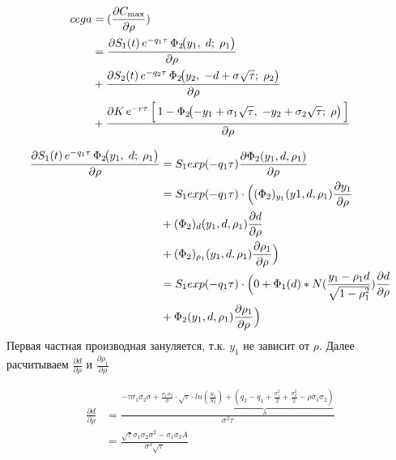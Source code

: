 \begin{equation}
\begin{aligned}
cega &= (\frac{\partial C_{\max}}{\partial \rho})  \\
     &= \frac{\partial S_1(t)\,e^{-q_1\tau}\,\Phi_2\!\bigl(y_1,\;d;\;\rho_1\bigr) }{\partial \rho} \\
     &+ \frac{\partial S_2(t)\,e^{-q_2\tau}\,\Phi_2\!\bigl(y_2,\;-d + \sigma \sqrt{\tau};\;\rho_2\bigr) }{\partial \rho} \\
     &+ \frac{\partial K\,e^{-r\tau}\,
        \Bigl[\,1 - \Phi_2\!\bigl(-y_1+\sigma_1\sqrt{\tau},\;
                              -y_2+\sigma_2\sqrt{\tau};\;\rho\bigr)\,\Bigr] }{\partial \rho}\\
\end{aligned}
\end{equation}

\begin{equation}
\begin{aligned}
\frac{\partial S_1(t)\,e^{-q_1\tau}\,\Phi_2\!\bigl(y_1,\;d;\;\rho_1\bigr) }{\partial \rho} 
&= S_1 exp(-q_1 \tau) \frac{\partial \Phi_2(y_1, d, \rho_1)}{\partial \rho} \\
&= S_1 exp(-q_1 \tau) \cdot \Bigl( (\Phi_2)_{y_1}(y1, d, \rho_1) \frac{\partial y_1}{\partial \rho} \\
&+ (\Phi_2)_d(y_1, d, \rho_1) \frac{\partial d}{\partial \rho} \\ 
&+ (\Phi_2)_{\rho_1}(y_1, d, \rho_1) \frac{\partial \rho_1}{\partial \rho}\Bigr) \\ 
&= S_1 exp(-q_1 \tau) \cdot \Bigl(0 + \Phi_1(d) * N(\frac{y_1 - \rho_1 d}{\sqrt{1 - \rho_1^2}}) \frac{\partial d}{\partial \rho} \\
&+ \Phi_2(y_1, d, \rho_1) \frac{\partial \rho_1}{\partial \rho}\Bigr) \\              
\end{aligned}
\end{equation}
Первая частная производная зануляется, т.к. $y_1$ не зависит от $\rho$. 
Далее расчитываем $\frac{\partial d}{\partial \rho}$ и $\frac{\partial \rho_1}{\partial \rho}$

\begin{equation}
\begin{aligned}
\frac{\partial d}{\partial \rho} &= \frac{-\tau \sigma_1 \sigma_2 \sigma 
+ \frac{\sigma_1 \sigma_2}{\sigma} \cdot \sqrt{\tau} \cdot \underbrace{ln(\frac{S_1}{S_2}) +
   (q_2 - q_1 + \frac{\sigma_1^2}{2} + \frac{\sigma_2^2}{2} - \rho \sigma_1 \sigma_2)}_{\text{A}}}{\sigma^2 \tau}\\
&= \frac{\sqrt{\tau} \sigma_1 \sigma_2 \sigma^2 - \sigma_1 \sigma_2 A}{\sigma^3 \sqrt{\tau}} \\
\end{aligned}
\end{equation}


